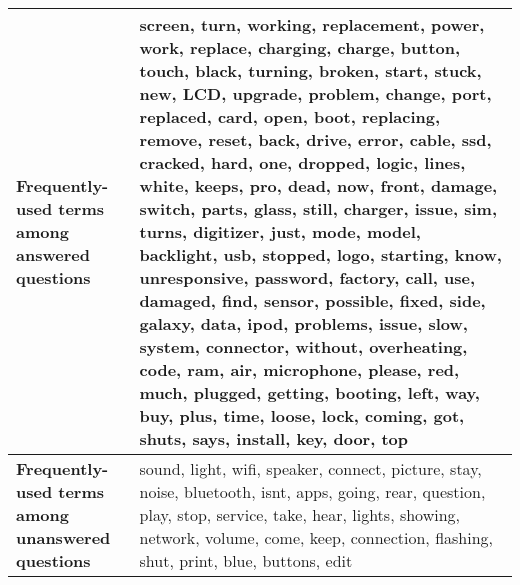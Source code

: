 \documentclass[]{interact}\usepackage[]{graphicx}\usepackage[]{color}
\begin{document}
\begin{table}[p]%
{}
{\begin{tabular}{|L{4cm}|L{8cm}|}
  \hline
 \textbf{Frequently-used terms among answered questions} & screen, turn, working, replacement, power, work, replace, charging, charge, button, touch, black, turning, broken, start, stuck, new, LCD, upgrade, problem, change, port, replaced, card, open, boot, replacing, remove, reset, back, drive, error, cable, ssd, cracked, hard, one, dropped, logic, lines, white, keeps, pro, dead, now, front, damage, switch, parts, glass, still, charger, issue, sim, turns, digitizer, just, mode, model, backlight, usb, stopped, logo, starting, know, unresponsive, password, factory, call, use, damaged, find, sensor, possible, fixed, side, galaxy, data, ipod, problems, issue, slow, system, connector, without, overheating, code, ram, air, microphone, please, red, much, plugged, getting, booting, left, way, buy, plus, time, loose, lock, coming, got, shuts, says, install, key, door, top \\
  \hline
  \textbf{Frequently-used terms among unanswered questions} & sound, light, wifi, speaker, connect, picture, stay, noise, bluetooth, isnt, apps, going, rear, question, play, stop, service, take, hear, lights, showing, network, volume, come, keep, connection, flashing, shut, print, blue, buttons, edit \\ 
   \hline
\end{tabular}}
\label{table:6}
\end{table}
\end{document}
